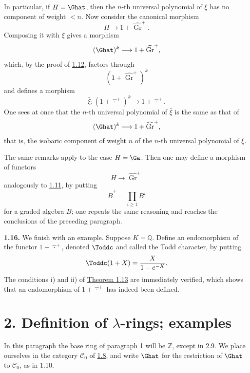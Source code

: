 In particular, if \(H=\Ghat\), then the \(n\)-th universal polynomial of \(\xi\) has no component of weight \(<n\). Now consider the canonical morphism
\[
  H\longrightarrow 1+\widehat{\operatorname{Gr}}^{+}.
\]
Composing it with \(\xi\) gives a morphism
\[
  (\Ghat)^k\longrightarrow 1+\widehat{\operatorname{Gr}}^{+},
\]
which, by the proof of \hyperlink{sga6.e05.lem.1-12}{1.12}, factors through
\[
  (1+\widehat{\operatorname{Gr}}^{+})^k
\]
and defines a morphism
\[
  \bar\xi:(1+\widehat{\,\cdot\,}^{+})^k\longrightarrow 1+\widehat{\,\cdot\,}^{+}.
\]
One sees at once that the \(n\)-th universal polynomial of \(\bar\xi\) is the same as that of
\[
  (\Ghat)^k\longrightarrow 1+\widehat{\operatorname{Gr}}^{+},
\]
that is, the isobaric component of weight \(n\) of the \(n\)-th universal polynomial of \(\xi\).

The same remarks apply to the case \(H=\Ga\). Then one may define a morphism of functors
\[
  H\longrightarrow \widehat{\operatorname{Gr}}^{+}
\]
analogously to \hyperlink{sga6.e05.para.1-11}{1.11}, by putting
\[
  \widehat B^{+}=\prod_{i\geq 1}B^i
\]
for a graded algebra \(B\); one repeats the same reasoning and reaches the conclusions of the preceding paragraph.

\textbf{1.16.} We finish with an example. Suppose \(K=\mathbb Q\). Define an endomorphism of the functor \(1+\widehat{\,\cdot\,}^{+}\), denoted \(\Toddc\) and called the Todd character, by putting
\[
  \Toddc(1+X)=\frac{X}{1-e^{-X}}.
\]
The conditions i) and ii) of \hyperlink{sga6.e05.thm.1-13}{Theorem 1.13} are immediately verified, which shows that an endomorphism of \(1+\widehat{\,\cdot\,}^{+}\) has indeed been defined.

\section*{2. Definition of \(\lambda\)-rings; examples}

In this paragraph the base ring of paragraph 1 will be \(\mathbb Z\), except in 2.9. We place ourselves in the category \(\mathcal C_0\) of \hyperlink{sga6.e05.para.1-8}{1.8}, and write \(\Ghat\) for the restriction of \(\Ghat\) to \(\mathcal C_0\), as in 1.10.

